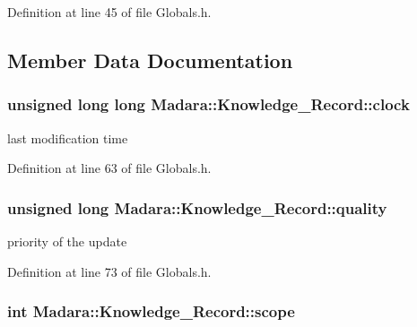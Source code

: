 Definition at line 45 of file Globals.h.



\subsection{Member Data Documentation}
\hypertarget{classMadara_1_1Knowledge__Record_aca8e7f63c349e5790602209fb8db2c51}{
\subsubsection[{clock}]{\setlength{\rightskip}{0pt plus 5cm}unsigned long long {\bf Madara::Knowledge\_\-Record::clock}}}
\label{d9/dcb/classMadara_1_1Knowledge__Record_aca8e7f63c349e5790602209fb8db2c51}


last modification time 



Definition at line 63 of file Globals.h.

\hypertarget{classMadara_1_1Knowledge__Record_ad106dacb16a7a9f4e4a3e68ac04a41d2}{
\subsubsection[{quality}]{\setlength{\rightskip}{0pt plus 5cm}unsigned long {\bf Madara::Knowledge\_\-Record::quality}}}
\label{d9/dcb/classMadara_1_1Knowledge__Record_ad106dacb16a7a9f4e4a3e68ac04a41d2}


priority of the update 



Definition at line 73 of file Globals.h.

\hypertarget{classMadara_1_1Knowledge__Record_a54aec9af28fc19d82a92097b2acd8cf8}{
\subsubsection[{scope}]{\setlength{\rightskip}{0pt plus 5cm}int {\bf Madara::Knowledge\_\-Record::scope}}}
\label{d9/dcb/classMadara_1_1Knowledge__Record_a54aec9af28fc19d82a92097b2acd8cf8}


